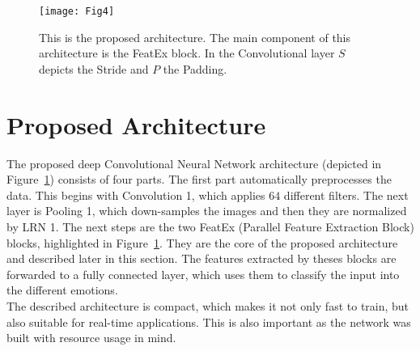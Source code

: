 \documentclass[10pt,journal,compsoc, hidelinks]{IEEEtran}
\begin{document}
 \begin{figure}[]\centering
\texttt{[image: Fig4]}

\caption{This is the proposed architecture. The main component of this architecture is the FeatEx block. In the Convolutional layer $S$ depicts the Stride and $P$ the Padding.}
\label{fig:architecture}
\end{figure}


\section{Proposed Architecture}
\label{sec:architecture}


The proposed deep Convolutional Neural Network architecture (depicted in Figure~\ref{fig:architecture}) consists of four parts. The first part automatically preprocesses the data. This begins with Convolution 1, which applies $64$ different filters. The next layer is Pooling 1, which down-samples the images and then they are normalized by LRN 1. The next steps are the two FeatEx (Parallel Feature Extraction Block) blocks, highlighted in Figure~\ref{fig:architecture}. They are the core of the proposed architecture and described later in this section. The features extracted by theses blocks are forwarded to a fully connected layer, which uses them to classify the input into the different emotions.\\
The described architecture is compact, which makes it not only fast to train, but also suitable for real-time applications. This is also important as the network was built with resource usage in mind.
\end{document}
